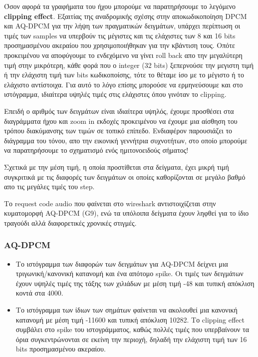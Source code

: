 \documentclass[hidelinks, 12pt, a4paper]{article}
\begin{document}
Όσον αφορά τα γραφήματα του ήχου μπορούμε να παρατηρήσουμε το λεγόμενο \textbf{clipping effect}. Εξαιτίας της αναδρομικής σχέσης στην αποκωδικοποίηση DPCM και AQ-DPCM για την λήψη των πραγματικών δειγμάτων, υπάρχει περίπτωση οι τιμές των samples να υπερβούν τις μέγιστες και τις ελάχιστες των 8 και 16 bits προσημασμένου ακεραίου που χρησιμοποιήθηκαν για την κβάντιση τους. Οπότε προκειμένου να αποφύγουμε το ενδεχόμενο να γίνει roll back απο την μεγαλύτερη τιμή στην μικρότερη, κάθε φορά που ο integer (32 bits) ξεπερνούσε την μεγιστη τιμή ή την ελάχιστη τιμή των bits κωδικοποίσης, τότε το θέταμε ίσο με το μέγιστο ή το ελάχιστο αντίστοιχα. Για αυτό το λόγο επίσης μπορούσε να ερμηνεύσουμε και στο ιστόγραμμα, ιδιαίτερα υψηλές τιμές στις ελάχιστες όπου γινόταν το clipping.

Επειδή ο αριθμός των δειγμάτων είναι ιδιαίτερα υψηλός, έχουμε προσθέσει στα διαγράμματα ήχου και zoom in εκδοχές προκειμένου να έχουμε μια αίσθηση του τρόπου διακύμανσης των τιμών σε τοπικό επίπεδο. Ενδιαφέρον παρουσιάζει το διάγραμμα του τόνου, απο την εικονική γεννήτρια συχνοτήτων, στο οποίο μπορούμε να παρατηρήσουμε το σχηματισμό ενός ημιτονοειδούς σήματος!

Σχετικά με την μέση τιμή, η οποία προστίθεται στα δείγματα, έχει μικρή τιμή συγκριτικά με τις διαφορές των δειγμάτων οι οποίες καθορίζονται σε μεγάλο βαθμό απο τις μεγάλες τιμές του step.

Το request code audio που φαίνεται στο wireshark αντιστοιχίζεται στην κυματομορφή AQ-DPCM (G9), ενώ τα υπόλοιπα δείγματα έχουν ληφθεί για το ίδιο τραγούδι αλλά διαφορετικές χρονικές στιγμές.

\subsubsection{AQ-DPCM}

\begin{itemize}
    \item Το ιστόγραμμα των διαφορών των δειγμάτων για AQ-DPCM δείχνει μια τριγωνική/κανονική κατανομή και ένα απότομο spike. Οι τιμές των δειγμάτων έχουν υψηλές τιμές της τάξης των χιλιάδων με μέση τιμή -48 και τυπική απόκλιση κοντά στα 4000.
    \item Το ιστόγραμμα των ίδιων των σημάτων φαίνεται να ακολουθεί μια κανονική κατανομή με μέση τιμή -11600 και τυπική απόκλιση 10282. Το clipping effect συμβάλει στο spike του ιστογράμματος, καθώς πολλές τιμές που υπερβαίνουν τα όρια συγκεντρώνονται σε εκείνη την περιοχή, δηλαδή την ελάχιστη τιμή των 16 bits προσημασμένου ακεραίου.
\end{itemize}
\end{document}
